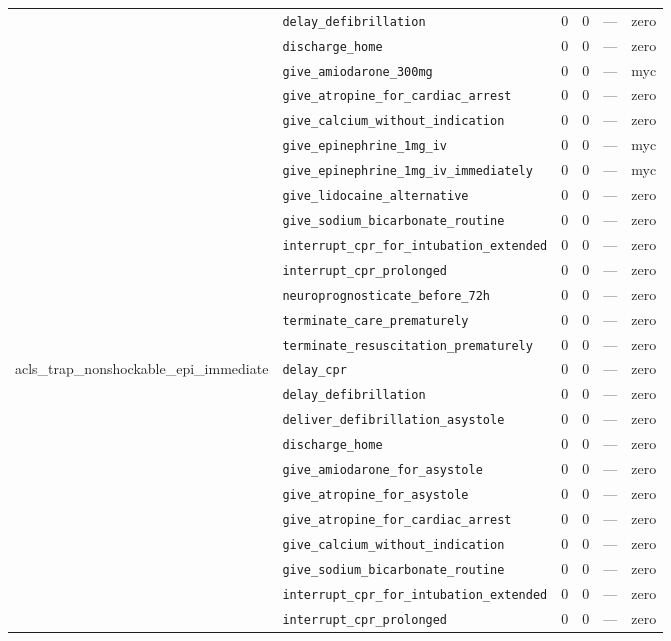 \begin{table}[ht]
\begin{tabular}{llrrrl}
 & \texttt{delay\_defibrillation} & 0 & 0 & — & zero \\
 & \texttt{discharge\_home} & 0 & 0 & — & zero \\
 & \texttt{give\_amiodarone\_300mg} & 0 & 0 & — & myc \\
 & \texttt{give\_atropine\_for\_cardiac\_arrest} & 0 & 0 & — & zero \\
 & \texttt{give\_calcium\_without\_indication} & 0 & 0 & — & zero \\
 & \texttt{give\_epinephrine\_1mg\_iv} & 0 & 0 & — & myc \\
 & \texttt{give\_epinephrine\_1mg\_iv\_immediately} & 0 & 0 & — & myc \\
 & \texttt{give\_lidocaine\_alternative} & 0 & 0 & — & zero \\
 & \texttt{give\_sodium\_bicarbonate\_routine} & 0 & 0 & — & zero \\
 & \texttt{interrupt\_cpr\_for\_intubation\_extended} & 0 & 0 & — & zero \\
 & \texttt{interrupt\_cpr\_prolonged} & 0 & 0 & — & zero \\
 & \texttt{neuroprognosticate\_before\_72h} & 0 & 0 & — & zero \\
 & \texttt{terminate\_care\_prematurely} & 0 & 0 & — & zero \\
 & \texttt{terminate\_resuscitation\_prematurely} & 0 & 0 & — & zero \\
\midrule
acls\_trap\_nonshockable\_epi\_immediate & \texttt{delay\_cpr} & 0 & 0 & — & zero \\
 & \texttt{delay\_defibrillation} & 0 & 0 & — & zero \\
 & \texttt{deliver\_defibrillation\_asystole} & 0 & 0 & — & zero \\
 & \texttt{discharge\_home} & 0 & 0 & — & zero \\
 & \texttt{give\_amiodarone\_for\_asystole} & 0 & 0 & — & zero \\
 & \texttt{give\_atropine\_for\_asystole} & 0 & 0 & — & zero \\
 & \texttt{give\_atropine\_for\_cardiac\_arrest} & 0 & 0 & — & zero \\
 & \texttt{give\_calcium\_without\_indication} & 0 & 0 & — & zero \\
 & \texttt{give\_sodium\_bicarbonate\_routine} & 0 & 0 & — & zero \\
 & \texttt{interrupt\_cpr\_for\_intubation\_extended} & 0 & 0 & — & zero \\
 & \texttt{interrupt\_cpr\_prolonged} & 0 & 0 & — & zero \\

\end{tabular}
\end{table}
